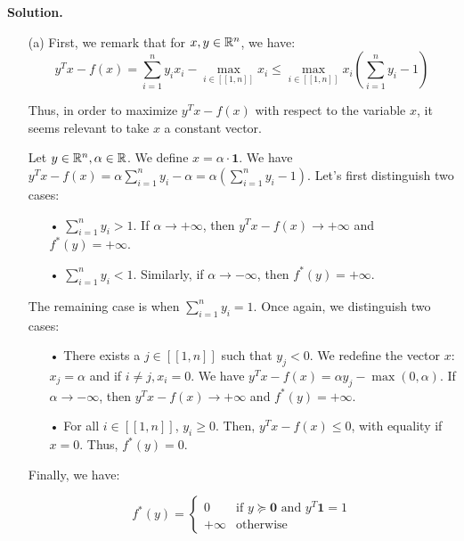 \documentclass[a4paper, 11pt]{report}
\begin{document}
\noindent \textbf{Solution.}

\begin{itemize}
    \item[(a)] First, we remark that for $x, y \in \mathbb{R}^{n}$, we have:
    \[ y^{T}x - f(x) = \sum_{i=1}^{n} y_{i}x_{i} - \max_{i \in [\![ 1, n ]\!]} x_{i} \leq \max_{i \in [\![ 1, n ]\!]} x_{i} \left( \sum_{i=1}^{n} y_{i} - 1 \right) \]
    
    Thus, in order to maximize $y^{T}x - f(x)$ with respect to the variable $x$, it seems relevant to take $x$ a constant vector.
    
    Let $y \in \mathbb{R}^{n}, \alpha \in \mathbb{R}$. We define $x = \alpha \cdot \mathbf{1}$. We have $y^{T}x - f(x) = \alpha \sum_{i=1}^{n} y_{i} - \alpha = \alpha \left( \sum_{i=1}^{n} y_{i} - 1 \right)$. Let's first distinguish two cases:
    
    \begin{itemize}
        \item[•] $\sum_{i=1}^{n} y_{i} > 1$. If $\alpha \longrightarrow + \infty$, then $y^{T}x - f(x) \longrightarrow + \infty$ and $f^{*}(y) = + \infty$.
        
        \item[•] $\sum_{i=1}^{n} y_{i} < 1$. Similarly, if $\alpha \longrightarrow - \infty$, then $f^{*}(y) = + \infty$.
    \end{itemize}
    
    The remaining case is when $\sum_{i=1}^{n} y_{i} = 1$. Once again, we distinguish two cases:
    
    \begin{itemize}
        \item[•] There exists a $j \in [\![ 1, n ]\!]$ such that $y_{j} < 0$. We redefine the vector $x$: $x_{j} = \alpha$ and if $i \neq j, x_{i} = 0$. We have $y^{T}x - f(x) = \alpha y_{j} - \max(0, \alpha)$. If $\alpha \longrightarrow - \infty$, then $y^{T}x - f(x) \longrightarrow + \infty$ and $f^{*}(y) = + \infty$.
        
        \item[•] For all $i \in [\![ 1, n ]\!]$, $y_{i} \geq 0$. Then, $y^{T}x - f(x) \leq 0$, with equality if $x = 0$. Thus, $f^{*}(y) = 0$.
    \end{itemize}
    
    Finally, we have:

    \[ \boxed{f^{*}(y) = \begin{cases}
        0        & \text{if } y \succeq \mathbf{0} \text{ and } y^{T}\mathbf{1} = 1 \\
        + \infty & \text{otherwise }
        \end{cases}} \]
    

\end{itemize}
\end{document}
